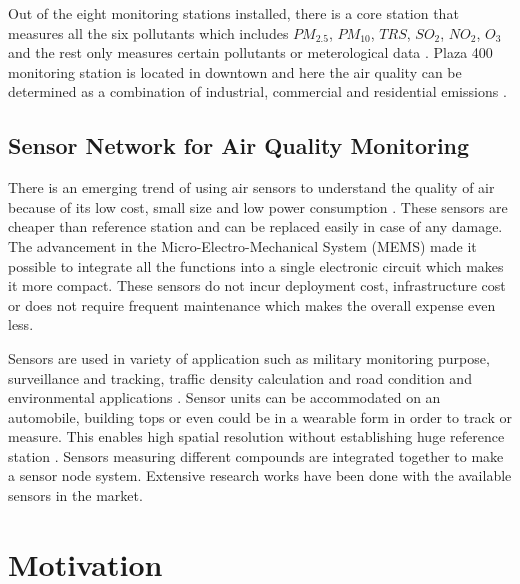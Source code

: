 Out of the eight monitoring stations installed, there is a core station that measures all the six pollutants which includes $PM_{2.5}$, $PM_{10}$, $TRS$, $SO_{2}$, $NO_2$, ${O_3}$ and the rest only measures certain pollutants or meterological data \cite{Environment2016}. Plaza 400 monitoring station is located in downtown and here the air quality can be determined as a combination of industrial, commercial and residential emissions \cite{Authority2011}.


\subsection{Sensor Network for Air Quality Monitoring}

There is an emerging trend of using air sensors to understand the quality of air because of its low cost, small size and low power consumption \cite{Sun2016}. These sensors are cheaper than reference station and can be replaced easily in case of any damage. The advancement in the Micro-Electro-Mechanical System (MEMS) made it possible to integrate all the functions into a single electronic circuit which makes it more compact. These sensors do not incur deployment cost, infrastructure cost or does not require frequent maintenance which makes the overall expense even less.
\par

Sensors are used in variety of application such as military monitoring purpose, surveillance and tracking, traffic density calculation and road condition and environmental applications \cite{Kadri2013}. Sensor units can be accommodated on an automobile, building tops or even could be in a wearable form in order to track or measure. This enables high spatial resolution without establishing huge reference station \cite{Nodes2015}. Sensors measuring different compounds are integrated together to make a sensor node system. Extensive research works have been done with the available sensors in the market.

\section{Motivation}

